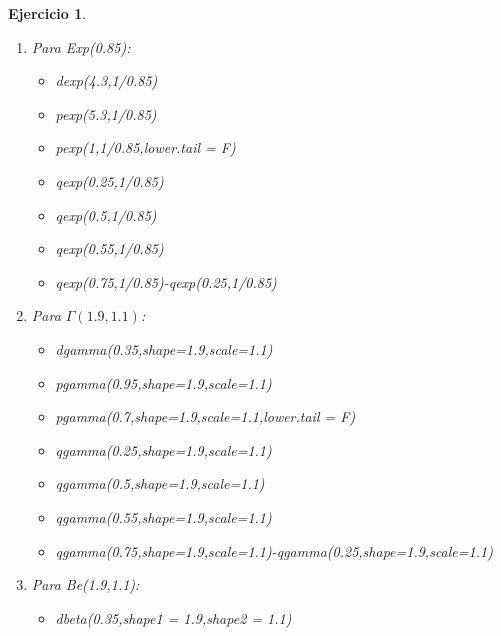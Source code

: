 \documentclass[11pt, a4paper]{article}
\newif\IfInSansMode
\theoremstyle{theorem-style}
\theoremstyle{definition-style}
\newtheorem{ejer}{Ejercicio}[section]
\theoremstyle{remark-style}
\theoremstyle{example-style}
\begin{document}
\begin{ejer}
\begin{enumerate}
\begin{itemize}
		\item qnorm(0.25,mean=4.4,sd=sqrt(1.4))
		
		\item qnorm(0.5,mean=4.4,sd=sqrt(1.4))
		
		\item qnorm(0.55,mean=4.4,sd=sqrt(1.4))
		
		\item qnorm(0.75,mean=4.4,sd=sqrt(1.4))-qnorm(0.25,mean=4.4,sd=sqrt(1.4))
	\end{itemize}
	\item Para Exp(0.85):
		\begin{itemize}
			\item dexp(4.3,1/0.85)
			
			\item pexp(5.3,1/0.85)
			
			\item pexp(1,1/0.85,lower.tail = F)
			
			\item qexp(0.25,1/0.85)
			
			\item qexp(0.5,1/0.85)
			
			\item qexp(0.55,1/0.85)
			
			\item qexp(0.75,1/0.85)-qexp(0.25,1/0.85)
		\end{itemize}
	\item Para $\Gamma(1.9,1.1)$:
		\begin{itemize}
			\item dgamma(0.35,shape=1.9,scale=1.1)
			
			\item pgamma(0.95,shape=1.9,scale=1.1)
			
			\item pgamma(0.7,shape=1.9,scale=1.1,lower.tail = F)
			
			\item qgamma(0.25,shape=1.9,scale=1.1)
			
			\item qgamma(0.5,shape=1.9,scale=1.1)
			
			\item qgamma(0.55,shape=1.9,scale=1.1)
			
			\item qgamma(0.75,shape=1.9,scale=1.1)-qgamma(0.25,shape=1.9,scale=1.1)
		\end{itemize}
		\item Para Be(1.9,1.1):
		\begin{itemize}
			\item dbeta(0.35,shape1 = 1.9,shape2 = 1.1)
			

\end{itemize}
\end{enumerate}
\end{ejer}
\end{document}
